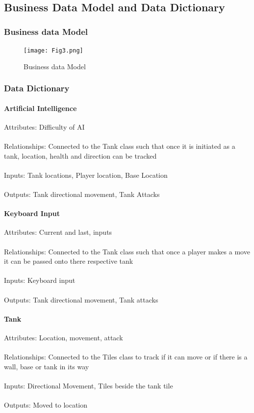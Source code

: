 \documentclass[12pt, titlepage]{article}
\begin{document}
\subsection{Business Data Model and Data Dictionary}
\subsubsection{Business data Model}
\begin{figure}[hp]
\texttt{[image: Fig3.png]}
\caption{Business data Model} \label{fig:Fig3.png}
\end{figure}
\subsubsection{Data Dictionary}
\paragraph{Artificial Intelligence}
Attributes: Difficulty of AI
\\\\Relationships:  Connected to the Tank class such that once it is initiated 
as a tank, location, health and direction can be tracked
\\\\Inputs: Tank locations, Player location, Base Location
\\\\Outputs: Tank directional movement, Tank Attacks
\paragraph{Keyboard Input}
Attributes: Current and last, inputs
\\\\Relationships: Connected to the Tank class such that once a player makes a 
move it can be passed onto there respective tank
\\\\Inputs: Keyboard input
\\\\Outputs: Tank directional movement, Tank attacks
\paragraph{Tank}
Attributes: Location, movement, attack
\\\\Relationships: Connected to the Tiles class to track if it can move or if 
there is a wall, base or tank in its way
\\\\Inputs: Directional Movement, Tiles beside the tank tile
\\\\Outputs: Moved to location
\end{document}
